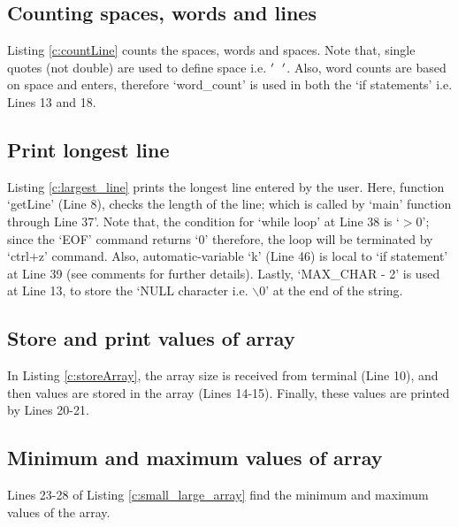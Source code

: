 

\subsection{Counting spaces, words and lines}
Listing \ref{c:countLine} counts the spaces, words and spaces. Note that, single quotes (not double) are used to define space i.e. $' \rm{ \ } \rm{ \ } '$. Also, word counts are based on space and enters, therefore `word\_count' is used in both the `if statements' i.e. Lines 13 and 18. 



\subsection{Print longest line}
Listing \ref{c:largest_line} prints the longest line entered by the user. Here, function `getLine' (Line 8), checks the length of the line; which is called by `main' function through Line 37'. Note that, the condition for `while loop' at Line 38 is `$> 0$'; since the `EOF' command returns `0' therefore, the loop will be terminated by `ctrl+z' command. Also, automatic-variable `k' (Line 46) is local to `if statement' at Line 39 (see comments for further details). Lastly, 	`MAX\_CHAR - 2' is used at Line 13, to store the `NULL character i.e. $\backslash 0$' at the end of the string. 


\subsection{Store and print values of array}
In Listing \ref{c:storeArray}, the array size is received from terminal (Line 10), and then values are stored in the array (Lines 14-15). Finally, these values are printed by Lines 20-21. 


\subsection{Minimum and maximum values of array}
Lines 23-28 of Listing \ref{c:small_large_array} find the minimum and maximum values of the array.


